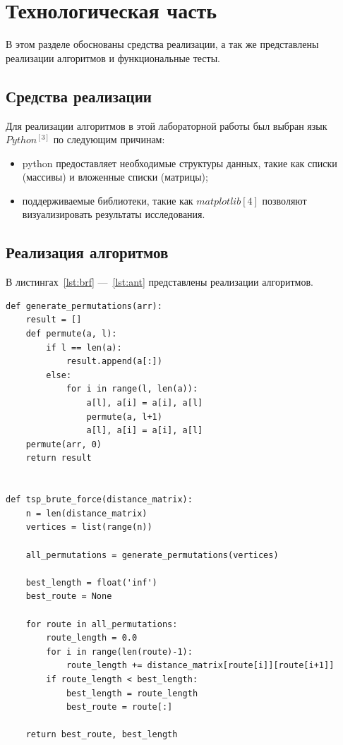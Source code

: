 \clearpage


\chapter{Технологическая часть}\label{ch:-2}

В этом разделе обоснованы средства реализации, а так же представлены реализации алгоритмов и функциональные тесты.


\section{Средства реализации}\label{sec:-2}

Для реализации алгоритмов в этой лабораторной работы был выбран язык $Python^{[3]}$ по следующим причинам:
\begin{itemize}
    \item python предоставляет необходимые структуры данных, такие как списки (массивы) и вложенные списки (матрицы);
    \item поддерживаемые библиотеки, такие как $matplotlib{[4]}$ позволяют визуализировать результаты исследования.
\end{itemize}

\clearpage


\section{Реализация алгоритмов}

В листингах~\ref{lst:brf} ---~\ref{lst:ant} представлены реализации алгоритмов.

\begin{lstlisting}[style=python, label=lst:brf,caption=Алгоритм полного перебора]
def generate_permutations(arr):
    result = []
    def permute(a, l):
        if l == len(a):
            result.append(a[:])
        else:
            for i in range(l, len(a)):
                a[l], a[i] = a[i], a[l]
                permute(a, l+1)
                a[l], a[i] = a[i], a[l]
    permute(arr, 0)
    return result


def tsp_brute_force(distance_matrix):
    n = len(distance_matrix)
    vertices = list(range(n))

    all_permutations = generate_permutations(vertices)

    best_length = float('inf')
    best_route = None

    for route in all_permutations:
        route_length = 0.0
        for i in range(len(route)-1):
            route_length += distance_matrix[route[i]][route[i+1]]
        if route_length < best_length:
            best_length = route_length
            best_route = route[:]

    return best_route, best_length
\end{lstlisting}
\clearpage


